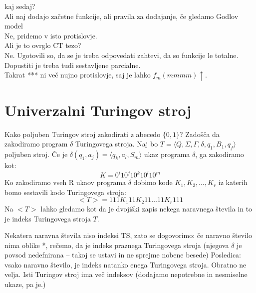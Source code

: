 \documentclass[10pt,a4paper,oneside]{book}
\begin{document}
{	kaj sedaj?\\
	Ali naj dodajo začetne funkcije, ali pravila za dodajanje, če gledamo Godlov model\\%
	Ne, pridemo v isto protislovje.\\

	Ali je to ovrglo CT tezo?\\
	Ne. Ugotovili so, da se je treba odpovedati zahtevi, da so funkcije le totalne. Dopustiti je treba tudi sestavljene parcialne.\\
	Takrat *** ni več nujno protislovje, saj je lahko $f_m(mmmm)\uparrow$.
}

\section{Univerzalni Turingov stroj}

Kako poljuben Turingov stroj zakodirati z abecedo $\{0,1\}$?
Zadošča da zakodiramo program $\delta$ Turingovega stroja.%
Naj bo $T=\langle Q,\Sigma,\Gamma,\delta,q_1,B_1,q_f \rangle$ poljuben stroj.%
Če je $\delta(q_1,a_j)=\langle q_k, a_l, S_m \rangle$ ukaz programa $\delta$, ga zakodiramo kot:
	\[ K=0^i 1 0^j 1 0^k 1 0^l 1 0^m\]
Ko zakodiramo vseh R ukaov programa $\delta$ dobimo kode $K_1, K_2, \dots, K_r$ iz katerih bomo sestavili kodo Turingovega stroja:
	\[ <T> = 111 K_1 11 K_2 11 \dots 11 K_r 111\]%
Na $<T>$ lahko gledamo kot da je dvojiški zapis nekega naravnega števila in to je indeks Turingovega stroja $T$.

Nekatera naravna števila niso indeksi TS, zato se dogovorimo: če naravno število nima oblike *, rečemo, da je indeks praznega Turingovega stroja (njegova $\delta$ je povsod nedefnirana -- takoj se ustavi in ne sprejme nobene besede)
Posledica: vsako naravno število, je indeks natanko enega Turingovega stroja.
Obratno ne velja. Isti Turingov stroj ima več indeksov (dodajamo nepotrebne in nesmiselne ukaze, pa je.)
%
\end{document}
